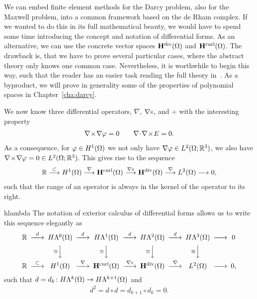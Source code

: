 \begin{intro}
  We can embed finite element methods for the Darcy problem, also for
  the Maxwell problem, into a common framework based on the de Rham
  complex. If we wanted to do this in its full mathematical beauty, we
  would have to spend some time introducing the concept and notation
  of differential forms. As an alternative, we can use the concrete
  vector spaces $\mathbf H^{\text{div}}(\Omega)$ and $\mathbf H^{\text{curl}}(\Omega)$. The drawback
  is, that we have to prove several particular cases, where the
  abstract theory only knows one common case. Nevertheless, it is
  worthwhile to begin this way, such that the reader has an easier
  task reading the full theory
  in~\cite{ArnoldFalkWinther06acta,ArnoldFalkWinther10}. As a byproduct,
  we will prove in generality some of the properties of polynomial
  spaces in Chapter~\ref{cha:darcy}.
\end{intro}

\begin{intro}
  We now know three differential operators, $\nabla$, $\nabla\!\times\!$, and
  $\div$ with the interesting property
  \begin{gather}
    \label{eq:derham:10}
    \nabla\!\times\!\nabla \varphi = 0
    \qquad \nabla\!\cdot\!\nabla\!\times\! E=0.
  \end{gather}
  As a consequence, for $\varphi\in H^1(\Omega)$ we not only have
  $\nabla \varphi\in L^2(\Omega;\mathbb R^3)$, we also have
  $\nabla\!\times\!\nabla\varphi=0\in L^2(\Omega;\mathbb R^3)$. This gives rise to the sequence
  \begin{gather}
    \label{eq:derham:11}
    \mathbb R
    \overset{\subset}{\longrightarrow} H^1(\Omega)
    \overset{\nabla}{\longrightarrow} \mathbf H^{\text{curl}}(\Omega)
    \overset{\nabla\!\times\!}{\longrightarrow} \mathbf H^{\text{div}}(\Omega)
    \overset{\nabla\!\cdot\!}{\longrightarrow} L^2(\Omega)
    \longrightarrow 0,
  \end{gather}
  such that the range of an operator is always in the kernel of the
  operator to its right.
\end{intro}

\begin{Notation}{hlambda}
  The notation of exterior calculus of differential forms allows us to
  write this sequence elegantly as
  \begin{gather}\minCDarrowwidth20pt
    \label{eq:derham:9}
    \begin{CD}
      \R
      @>{d}>> H\Lambda^0(\domain)
      @>{d}>> H\Lambda^1(\domain)
      @>{d}>> H\Lambda^2(\domain)
      @>{d}>> H\Lambda^3(\domain)
      @>>> 0
      \\
      @.
      @V{\cong}VV
      @V{\cong}VV
      @V{\cong}VV
      @V{\cong}VV
      \\
      \R
      @>{\subset}>> H^1(\domain)
      @>{\nabla}>> \Hcurl(\domain)
      @>{\curl}>> \Hdiv(\domain)
      @>{\div}>> L^2(\domain)
      @>>> 0,
    \end{CD}
  \end{gather}
  such that $d=d_k\colon H\Lambda^k(\Omega) \to H\Lambda^{k+1}(\Omega)$ and
  \begin{gather}
    d^2 = d\circ d = d_{k+1} \circ d_k = 0.
  \end{gather}
\end{Notation}

